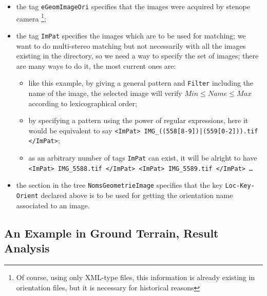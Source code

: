\begin{itemize}
   \item the tag {\tt eGeomImageOri} specifies that the images were acquired by stenope
         camera \footnote{Of course, using only XML-type files, this information is already
         existing in orientation files, but it is necessary for historical reasons};

    \item the tag {\tt ImPat} specifies the images which are to be used for matching; we want
          to do multi-stereo matching but not necessarily with all the images existing in the
          directory, so we need a way to specify the set of images; there are many ways to
          do it, the most current ones are:

\begin{itemize}
        \item like this example, by giving a general pattern and {\tt Filter} including the name
              of the image, the selected image will verify $Min \leq Name \leq Max$ according
              to lexicographical order;
        \item by specifying a pattern using the power of regular expressions, here it would be
              equivalent to say {\tt <ImPat> IMG\_((558[8-9])|(559[0-2])).tif </ImPat>};
        \item as an arbitrary number of tags {\tt ImPat} can exist, it will be alright to
             have {\tt <ImPat> IMG\_5588.tif </ImPat> <ImPat> IMG\_5589.tif </ImPat> \dots}

\end{itemize}

    \item the section in the tree {\tt NomsGeometrieImage} specifies that the key {\tt Loc-Key-Orient}
          declared above is to be used for getting the orientation name associated to an image.

\end{itemize}




\subsection{An Example in Ground Terrain, Result Analysis}

\label{Ex:GrTer:RA}

